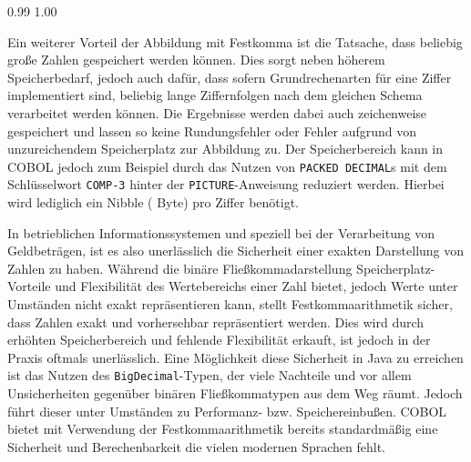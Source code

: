 \sepCodeAndOutputCheck
\begin{shellwindow}
0.99
1.00
\end{shellwindow}

Ein weiterer Vorteil der Abbildung mit Festkomma ist die Tatsache, dass beliebig große Zahlen gespeichert werden können. Dies sorgt neben höherem Speicherbedarf, jedoch auch dafür, dass sofern Grundrechenarten für eine Ziffer implementiert sind, beliebig lange Ziffernfolgen nach dem gleichen Schema verarbeitet werden können. Die Ergebnisse werden dabei auch zeichenweise gespeichert und lassen so keine Rundungsfehler oder Fehler aufgrund von unzureichendem Speicherplatz zur Abbildung zu. Der Speicherbereich kann in COBOL jedoch zum Beispiel durch das Nutzen von \texttt{PACKED DECIMAL}s mit dem Schlüsselwort \texttt{COMP-3} hinter der \texttt{PICTURE}-Anweisung reduziert werden. Hierbei wird lediglich ein Nibble ( Byte) pro Ziffer benötigt.

In betrieblichen Informationssystemen und speziell bei der Verarbeitung von Geldbeträgen, ist es also unerlässlich die Sicherheit einer exakten Darstellung von Zahlen zu haben. Während die binäre Fließkommadarstellung Speicherplatz-Vorteile und Flexibilität des Wertebereichs einer Zahl bietet, jedoch Werte unter Umständen nicht exakt repräsentieren kann, stellt Festkommaarithmetik sicher, dass Zahlen exakt und vorhersehbar repräsentiert werden. Dies wird durch erhöhten Speicherbereich und fehlende Flexibilität erkauft, ist jedoch in der Praxis oftmals unerlässlich. Eine Möglichkeit diese Sicherheit in Java zu erreichen ist das Nutzen des \texttt{BigDecimal}-Typen, der viele Nachteile und vor allem Unsicherheiten gegenüber binären Fließkommatypen aus dem Weg räumt. Jedoch führt dieser unter Umständen zu Performanz- bzw. Speichereinbußen. COBOL bietet mit Verwendung der Festkommaarithmetik bereits standardmäßig eine Sicherheit und Berechenbarkeit die vielen modernen Sprachen fehlt.

